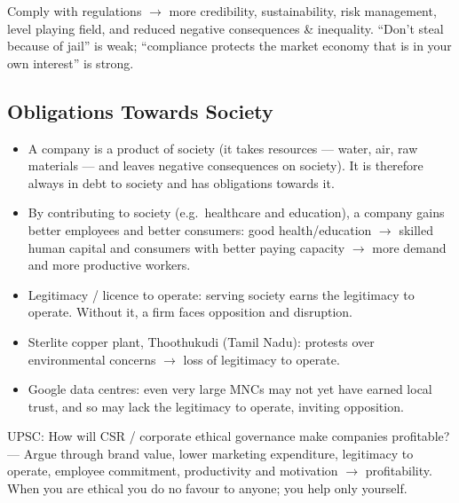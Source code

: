 \begin{QuickRevision}
Comply with regulations $\rightarrow$ more credibility, sustainability, risk management, level playing field, and reduced negative consequences \& inequality. ``Don't steal because of jail'' is weak; ``compliance protects the market economy that is in your own interest'' is strong.
\end{QuickRevision}

\subsection{Obligations Towards Society}
\begin{itemize}
\item A company is a product of society (it takes resources --- water, air, raw materials --- and leaves negative consequences on society). It is therefore always in debt to society and has obligations towards it.
\end{itemize}

\begin{KeyConcept}
\begin{itemize}
\item By contributing to society (e.g.\ healthcare and education), a company gains better employees and better consumers: good health/education $\rightarrow$ skilled human capital and consumers with better paying capacity $\rightarrow$ more demand and more productive workers.
\item Legitimacy / licence to operate: serving society earns the legitimacy to operate. Without it, a firm faces opposition and disruption.
\end{itemize}
\end{KeyConcept}

\begin{ExampleBox}
\begin{itemize}
\item Sterlite copper plant, Thoothukudi (Tamil Nadu): protests over environmental concerns $\rightarrow$ loss of legitimacy to operate.
\item Google data centres: even very large MNCs may not yet have earned local trust, and so may lack the legitimacy to operate, inviting opposition.
\end{itemize}
\end{ExampleBox}

\begin{PYQLink}
UPSC: How will CSR / corporate ethical governance make companies profitable? --- Argue through brand value, lower marketing expenditure, legitimacy to operate, employee commitment, productivity and motivation $\rightarrow$ profitability. When you are ethical you do no favour to anyone; you help only yourself.
\end{PYQLink}

